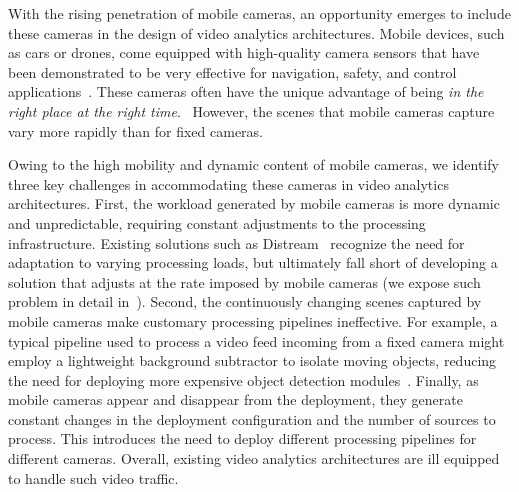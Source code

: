 With the rising penetration of mobile cameras, an opportunity emerges to include these cameras in the design of video analytics architectures. Mobile devices, such as cars or drones, come equipped with high-quality camera sensors that have been demonstrated to be very effective for navigation, safety, and control applications~\cite{wang2018bandwidth,grassi2017parkmaster}. These cameras often have the unique advantage of being {\em in the right place at the right time}.~ However, the scenes that mobile cameras capture vary more rapidly than for fixed cameras.

Owing to the high mobility and dynamic content of mobile cameras, we identify three key challenges in accommodating these cameras in video analytics architectures. First, the workload generated by mobile cameras is more dynamic and unpredictable, requiring constant adjustments to the processing infrastructure. Existing solutions such as Distream~\cite{zeng2020distream} recognize the need for adaptation to varying processing loads, but ultimately fall short of developing a solution that adjusts at the rate imposed by mobile cameras (we expose such problem in detail in~). Second, the continuously changing scenes captured by mobile cameras make customary processing pipelines ineffective. For example, a typical pipeline used to process a video feed incoming from a fixed camera might employ a lightweight background subtractor to isolate moving objects, reducing the need for deploying more expensive object detection modules~\cite{zeng2020distream}. Finally, as mobile cameras appear and disappear from the deployment, they generate constant changes in the deployment configuration and the number of sources to process. This introduces the need to deploy different processing pipelines for different cameras. Overall, existing video analytics architectures are ill equipped to handle such video traffic.

